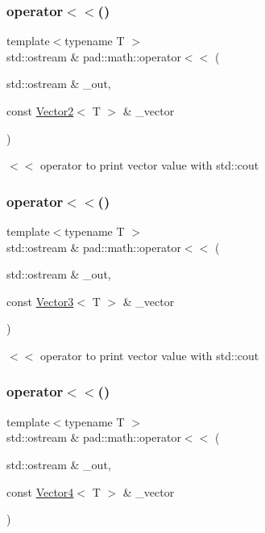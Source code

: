 \subsubsection{\texorpdfstring{operator$<$$<$()}{operator<<()}\hspace{0.1cm}{\footnotesize\ttfamily [1/3]}}
{\footnotesize\ttfamily template$<$typename T $>$ \\
std\+::ostream \& pad\+::math\+::operator$<$$<$ (\begin{DoxyParamCaption}\item[{std\+::ostream \&}]{\+\_\+out,  }\item[{const \mbox{\hyperlink{structpad_1_1math_1_1_vector2}{Vector2}}$<$ T $>$ \&}]{\+\_\+vector }\end{DoxyParamCaption})}

$<$$<$ operator to print vector value with std\+::cout \mbox{\label{namespacepad_1_1math_a9e468612d54c187ec0eaac48e304e673}} 
\subsubsection{\texorpdfstring{operator$<$$<$()}{operator<<()}\hspace{0.1cm}{\footnotesize\ttfamily [2/3]}}
{\footnotesize\ttfamily template$<$typename T $>$ \\
std\+::ostream \& pad\+::math\+::operator$<$$<$ (\begin{DoxyParamCaption}\item[{std\+::ostream \&}]{\+\_\+out,  }\item[{const \mbox{\hyperlink{structpad_1_1math_1_1_vector3}{Vector3}}$<$ T $>$ \&}]{\+\_\+vector }\end{DoxyParamCaption})}

$<$$<$ operator to print vector value with std\+::cout \mbox{\label{namespacepad_1_1math_aea739f95f7147095cec34ccedee7eea2}} 
\subsubsection{\texorpdfstring{operator$<$$<$()}{operator<<()}\hspace{0.1cm}{\footnotesize\ttfamily [3/3]}}
{\footnotesize\ttfamily template$<$typename T $>$ \\
std\+::ostream \& pad\+::math\+::operator$<$$<$ (\begin{DoxyParamCaption}\item[{std\+::ostream \&}]{\+\_\+out,  }\item[{const \mbox{\hyperlink{structpad_1_1math_1_1_vector4}{Vector4}}$<$ T $>$ \&}]{\+\_\+vector }\end{DoxyParamCaption})}

